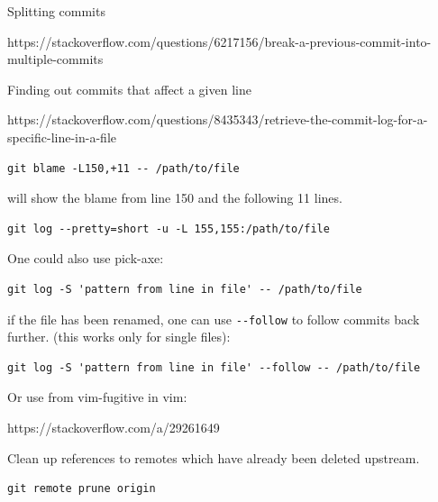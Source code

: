 \documentclass{git_course}
\begin{document}
Splitting commits

https://stackoverflow.com/questions/6217156/break-a-previous-commit-into-multiple-commits


Finding out commits that affect a given line

https://stackoverflow.com/questions/8435343/retrieve-the-commit-log-for-a-specific-line-in-a-file

\begin{verbatim}
git blame -L150,+11 -- /path/to/file
\end{verbatim}

will show the blame from line 150 and the following 11 lines.

\begin{verbatim}
git log --pretty=short -u -L 155,155:/path/to/file
\end{verbatim}

One could also use pick-axe:

\begin{verbatim}
git log -S 'pattern from line in file' -- /path/to/file
\end{verbatim}

if the file has been renamed, one can use \verb|--follow| to follow
commits back further.  (this works only for single files):

\begin{verbatim}
git log -S 'pattern from line in file' --follow -- /path/to/file
\end{verbatim}

Or use  from vim-fugitive in vim:

https://stackoverflow.com/a/29261649


Clean up references to remotes which have already been deleted upstream.

\begin{verbatim}
git remote prune origin
\end{verbatim}
\end{document}
